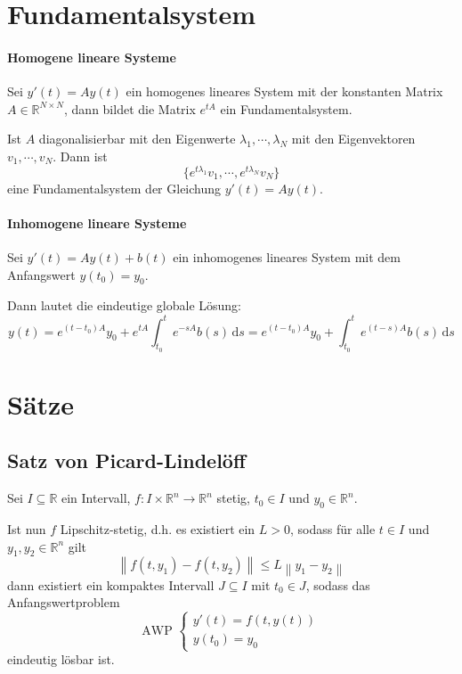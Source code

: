 \documentclass[a4paper, 11pt, accentcolor = tud3b]{tudreport}
\newcommand{\norm}[1]{\left \lVert #1 \right \rVert}
\begin{document}
        \section{Fundamentalsystem}
            \paragraph{Homogene lineare Systeme}
                Sei $ y'(t) = Ay(t) $ ein homogenes lineares System mit der konstanten Matrix $ A \in \mathbb{R} ^ { N \times N } $, dann bildet die Matrix $ e ^ { tA } $ ein Fundamentalsystem.

                Ist $ A $ diagonalisierbar mit den Eigenwerte $ \lambda _ 1, \cdots, \lambda _ N $ mit den Eigenvektoren $ v _ 1, \cdots, v _ N $. Dann ist \[ \{ e ^ { t \lambda _ 1 } v _ 1, \cdots, e ^ { t \lambda _ N } v _ N \} \] eine Fundamentalsystem der Gleichung $ y'(t) = Ay(t) $.

            \paragraph{Inhomogene lineare Systeme}
                Sei $ y'(t) = Ay(t) + b(t) $ ein inhomogenes lineares System mit dem Anfangswert $ y(t _ 0) = y _ 0 $.

                Dann lautet die eindeutige globale Lösung:
                \begin{equation*}
                    y(t) = e ^ { (t - t _ 0)A } y _ 0 + e ^ { tA } \int _ { t _ 0 } ^ t \! e ^ { -sA } b(s) \, \mathrm{d}s = e ^ { (t - t _ 0) A } y _ 0 + \int _ { t _ 0 } ^ t \! e ^ { (t - s) A } b(s) \, \mathrm{d}s
                \end{equation*}

        \section{Sätze}
            \subsection{Satz von Picard-Lindelöff}
                Sei $ I \subseteq \mathbb{R} $ ein Intervall, $ f : I \times \mathbb{R} ^ n \rightarrow \mathbb{R} ^ n $ stetig, $ t _ 0 \in I $ und $ y _ 0 \in \mathbb{R} ^ n $.

                Ist nun $ f $ Lipschitz-stetig, d.h. es existiert ein $ L > 0 $, sodass für alle $ t \in I $ und $ y _ 1, y _ 2 \in \mathbb{R} ^ n $ gilt \[ \norm{f(t, y _ 1) - f(t, y _ 2)} \leq L\norm{y _ 1 - y _ 2} \] dann existiert ein kompaktes Intervall $ J \subseteq I $ mit $ t _ 0 \in J $, sodass das Anfangswertproblem
                \begin{equation*}
                    \text{AWP }
                    \begin{cases}
                        y'(t) = f(t, y(t)) \\
                        y(t _ 0) = y _ 0
                    \end{cases}
                \end{equation*}
                eindeutig lösbar ist.
\end{document}
